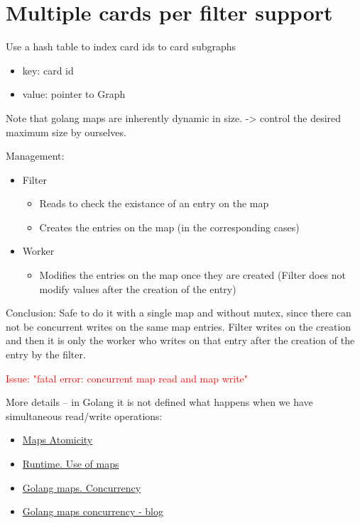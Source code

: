 \section{Multiple cards per filter support}

Use a hash table to index card ids to card subgraphs
\begin{itemize}
  \item key: card id
  \item value: pointer to Graph
\end{itemize}

Note that golang maps are inherently dynamic in size. -> control the desired maximum size by ourselves. 

Management:
\begin{itemize}
  \item Filter
  \begin{itemize}
    \item Reads to check the existance of an entry on the map
    \item Creates the entries on the map (in the corresponding cases)
  \end{itemize}
  \item Worker
  \begin{itemize}
    \item Modifies the entries on the map once they are created
    (Filter does not modify values after the creation of the entry)
  \end{itemize}
\end{itemize}

Conclusion: Safe to do it with a single map and without mutex, since
there can not be concurrent writes on the same map entries. Filter writes
on the creation and then it is only the worker who writes on that entry after
the creation of the entry by the filter.

\textcolor{red}{Issue: "fatal error: concurrent map read and map write"}

More details -- in Golang it is not defined what happens when we have simultaneous read/write operations:

\begin{itemize}
  \item \href{https://go.dev/doc/faq#atomic_maps}{Maps Atomicity}
  \item \href{https://go.dev/doc/go1.6}{Runtime. Use of maps}
  \item \href{https://go.dev/blog/maps}{Golang maps. Concurrency}
  \item \href{https://groups.google.com/g/golang-nuts/c/_XHqFejikBg?pli=1}{Golang maps concurrency - blog}
\end{itemize}

